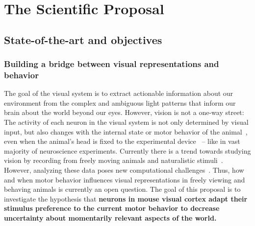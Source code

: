 \documentclass[B2,COG]{ercgrant}
\begin{document}
\maketitle



\chapter{The Scientific Proposal}


\section{State-of-the-art and objectives}\label{sec:stateofart}
\subsection{Building a bridge between visual representations and behavior}
The goal of the visual system is to extract actionable information about our environment from the complex and ambiguous light patterns that inform our brain about the world beyond our eyes.
However, vision is not a one-way street: The activity of each neuron in the visual system is not only determined by visual input, but also changes with the internal state or motor behavior of the animal~\parencite{Niell2010-bs, Musall2019-kd, Erisken2014-un, Franke2022-do}, even when the animal's head is fixed to the experimental device~\parencite{Stringer2019-lt, Musall2019-kd} -- like in vast majority of neuroscience experiments.
Currently there is a trend towards studying vision by recording from freely moving animals and naturalistic stimuli~\parencite{Parker2022-ac,Holmgren2021-jv}. 
However, analyzing these data poses new computational challenges~\parencite{Busse2017-rt}. 
Thus, how and when motor behavior influences visual representations in freely viewing and behaving animals is currently an open question. 
%
The goal of this proposal is to investigate the hypothesis that \textbf{neurons in mouse visual cortex adapt their stimulus preference to the current motor behavior to decrease uncertainty about momentarily relevant aspects of the world.} 
\end{document}
